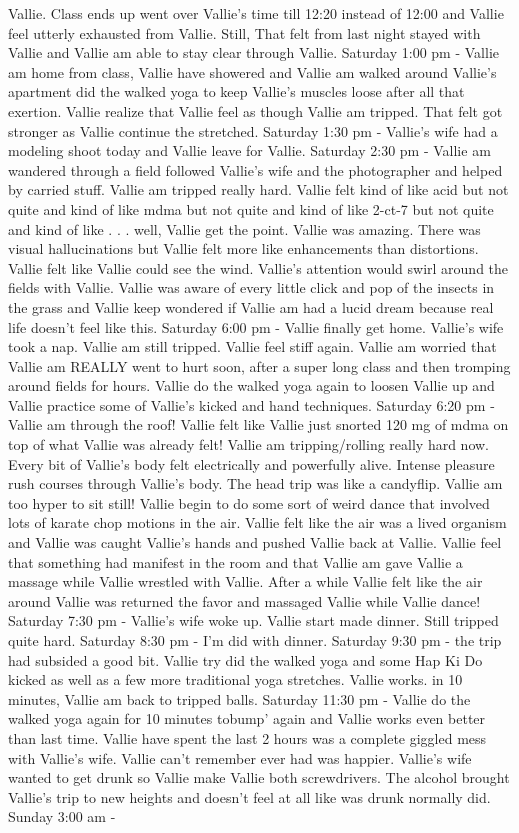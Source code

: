\documentclass[12pt]{book}
\begin{document}
Vallie. Class ends up went over Vallie's time till 12:20 instead of 12:00 and Vallie feel utterly exhausted from Vallie. Still, That felt from last night stayed with Vallie and Vallie am able to stay clear through Vallie. Saturday 1:00 pm - Vallie am home from class, Vallie have showered and Vallie am walked around Vallie's apartment did the walked yoga to keep Vallie's muscles loose after all that exertion. Vallie realize that Vallie feel as though Vallie am tripped. That felt got stronger as Vallie continue the stretched. Saturday 1:30 pm - Vallie's wife had a modeling shoot today and Vallie leave for Vallie. Saturday 2:30 pm - Vallie am wandered through a field followed Vallie's wife and the photographer and helped by carried stuff. Vallie am tripped really hard. Vallie felt kind of like acid but not quite and kind of like mdma but not quite and kind of like 2-ct-7 but not quite and kind of like . . .  well, Vallie get the point. Vallie was amazing. There was visual hallucinations but Vallie felt more like enhancements than distortions. Vallie felt like Vallie could see the wind. Vallie's attention would swirl around the fields with Vallie. Vallie was aware of every little click and pop of the insects in the grass and Vallie keep wondered if Vallie am had a lucid dream because real life doesn't feel like this. Saturday 6:00 pm - Vallie finally get home. Vallie's wife took a nap. Vallie am still tripped. Vallie feel stiff again. Vallie am worried that Vallie am REALLY went to hurt soon, after a super long class and then tromping around fields for hours. Vallie do the walked yoga again to loosen Vallie up and Vallie practice some of Vallie's kicked and hand techniques. Saturday 6:20 pm - Vallie am through the roof! Vallie felt like Vallie just snorted 120 mg of mdma on top of what Vallie was already felt! Vallie am tripping/rolling really hard now. Every bit of Vallie's body felt electrically and powerfully alive. Intense pleasure rush courses through Vallie's body. The head trip was like a candyflip. Vallie am too hyper to sit still! Vallie begin to do some sort of weird dance that involved lots of karate chop motions in the air. Vallie felt like the air was a lived organism and Vallie was caught Vallie's hands and pushed Vallie back at Vallie. Vallie feel that something had manifest in the room and that Vallie am gave Vallie a massage while Vallie wrestled with Vallie. After a while Vallie felt like the air around Vallie was returned the favor and massaged Vallie while Vallie dance! Saturday 7:30 pm - Vallie's wife woke up. Vallie start made dinner. Still tripped quite hard. Saturday 8:30 pm - I'm did with dinner. Saturday 9:30 pm - the trip had subsided a good bit. Vallie try did the walked yoga and some Hap Ki Do kicked as well as a few more traditional yoga stretches. Vallie works. in 10 minutes, Vallie am back to tripped balls. Saturday 11:30 pm - Vallie do the walked yoga again for 10 minutes tobump' again and Vallie works even better than last time. Vallie have spent the last 2 hours was a complete giggled mess with Vallie's wife. Vallie can't remember ever had was happier. Vallie's wife wanted to get drunk so Vallie make Vallie both screwdrivers. The alcohol brought Vallie's trip to new heights and doesn't feel at all like was drunk normally did. Sunday 3:00 am - 
\end{document}
